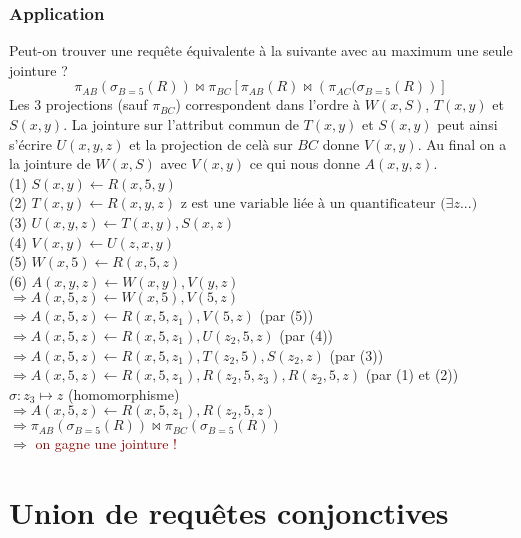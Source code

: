 \documentclass{article}
\newcommand{\red}[1]{\textcolor{darkred}{#1}}
\begin{document}
\newpage
\subsubsection{Application}

Peut-on trouver une requête équivalente à la suivante avec au maximum une seule jointure ?
\[
\pi_{AB} \left(\sigma_{B=5}(R)\right) \Join \pi_{BC} \left[ \pi_{AB}(R) \Join \left( \pi_{AC}(\sigma_{B=5}(R)\right)\right]
\]
Les 3 projections (sauf $\pi_{BC}$) correspondent dans l'ordre à $W(x,S)$, $T(x,y)$ et $S(x,y)$. La jointure sur l'attribut commun de $T(x,y)$ et $S(x,y)$ peut ainsi s'écrire
$U(x,y,z)$ et la projection de celà sur $BC$ donne $V(x,y)$. Au final on a la jointure de $W(x,S)$ avec $V(x,y)$ ce qui nous donne $A(x,y,z)$. \\

\noindent(1) $S(x,y) \leftarrow R(x,5,y)$ \\
(2) $T(x,y) \leftarrow R(x,y,z) \text{  z est une variable liée à un quantificateur (} \exists z ...)$\\
(3) $U(x,y,z) \leftarrow T(x,y), S(x,z)$ \\
(4) $V(x,y) \leftarrow U(z,x,y)$ \\
(5) $W(x,5) \leftarrow R(x,5,z)$ \\
(6) $A(x,y,z) \leftarrow W(x,y), V(y,z)$\\
$\Rightarrow A(x,5,z) \leftarrow W(x,5), V(5,z)$ \\
$\Rightarrow A(x,5,z) \leftarrow R(x,5,z_1), V(5,z)$ (par (5)) \\
$\Rightarrow A(x,5,z) \leftarrow R(x,5,z_1), U(z_2,5,z)$ (par (4)) \\
$\Rightarrow A(x,5,z) \leftarrow R(x,5,z_1), T(z_2,5), S(z_2,z)$ (par (3))\\
$\Rightarrow A(x,5,z) \leftarrow R(x,5,z_1),  R(z_2,5,z_3), R(z_2,5,z)$ (par (1) et (2)) \\
$ \boxed{\sigma:z_3 \mapsto z}$ (homomorphisme) \\
$\Rightarrow A(x,5,z) \leftarrow R(x,5,z_1), R(z_2,5,z)$ \\
$\Rightarrow \pi_{AB} \left( \sigma_{B=5}(R)\right) \Join \pi_{BC}\left(\sigma_{B=5}(R)\right)$\\

$\Rightarrow$ \red{on gagne une jointure !}

\section{Union de requêtes conjonctives}
\end{document}
